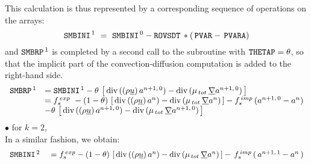\begin{itemize}
This calculation is thus represented by a corresponding sequence of operations on the arrays:
\begin{equation}\notag
\text{\texttt{SMBINI}}^{\,1}\ =\ \text{\texttt{SMBINI}}^{\,0} - \text{\texttt{ROVSDT}}\,*(\,\text{\texttt{PVAR}}-\,\text{\texttt{PVARA}})
\end{equation}
and $\text{\texttt{SMBRP}}^{\,1}$ is completed by a second call to the subroutine  with $\text{\texttt{THETAP}}=\theta$, so that the implicit part of the convection-diffusion computation is added to the right-hand side.
\begin{equation}\notag
\begin{array}{ll}
\text{\texttt{SMBRP}}^{\,1} & = \text{\texttt{SMBINI}}^{\,1} -\theta\,\left[\,\text{div}\,((\rho \underline{u})\,a^{n+1,\,0}) - \text{div}\,(\mu_{\,tot}\,\underline{\nabla} a^{n+1,\,0})\,\right]\\
& = f_s^{\,exp}\ - (1-\theta)\,\left[\,\text{div}\,((\rho \underline{u})\,a^{n}) - \text{div}\,(\mu_{\,tot}\,\underline{\nabla} a^{n})\,\right]- f_s^{\,imp}\,(a^{n+1,\,0} -a^{n}) \\
& -\theta\,\left[\,\text{div}\,((\rho \underline{u})\,a^{n+1,\,0}) - \text{div}\,(\mu_{\,tot}\,\underline{\nabla} a^{n+1,\,0})\,\right]\\
\end{array}
\end{equation}
$\bullet$ for $k = 2$,\\
In a similar fashion, we obtain:
\begin{equation}\notag
\begin{array}{ll}
\text{\texttt{SMBINI}}^{\,2}\ &=f_s^{\,exp}-(1-\theta)\,\left[\,\text{div}\,((\rho \underline{u})\,a^n) - \text{div}\,(\mu_{\,tot}\,\underline{\nabla} a^n)\,\right]-\,f_s^{\,imp}\,(\,a^{n+1,\,1} - a^n\,)\\
\end{array}
\end{equation}


\end{itemize}
